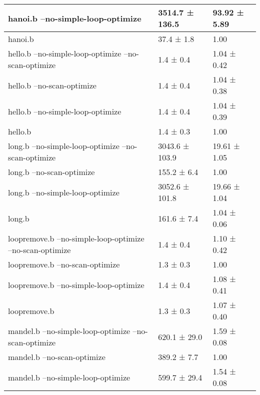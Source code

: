 \documentclass[11pt,answers]{exam}
\begin{document}
\begin{table}[H]
\begin{tabular}{|l|l|l|}
		hanoi.b --no-simple-loop-optimize                           & 3514.7 ± 136.5     & 93.92 ± 5.89      \\ \hline
		hanoi.b                                                     & 37.4 ± 1.8         & 1.00              \\ \hline
		\hline
		hello.b --no-simple-loop-optimize --no-scan-optimize        & 1.4 ± 0.4          & 1.04 ± 0.42       \\ \hline
		hello.b --no-scan-optimize                                  & 1.4 ± 0.4          & 1.04 ± 0.38       \\ \hline
		hello.b --no-simple-loop-optimize                           & 1.4 ± 0.4          & 1.04 ± 0.39       \\ \hline
		hello.b                                                     & 1.4 ± 0.3          & 1.00              \\ \hline
		\hline
		long.b --no-simple-loop-optimize --no-scan-optimize         & 3043.6 ± 103.9     & 19.61 ± 1.05      \\ \hline
		long.b --no-scan-optimize                                   & 155.2 ± 6.4        & 1.00              \\ \hline
		long.b --no-simple-loop-optimize                            & 3052.6 ± 101.8     & 19.66 ± 1.04      \\ \hline
		long.b                                                      & 161.6 ± 7.4        & 1.04 ± 0.06       \\ \hline
		\hline
		loopremove.b --no-simple-loop-optimize --no-scan-optimize   & 1.4 ± 0.4          & 1.10 ± 0.42       \\ \hline
		loopremove.b --no-scan-optimize                             & 1.3 ± 0.3          & 1.00              \\ \hline
		loopremove.b --no-simple-loop-optimize                      & 1.4 ± 0.4          & 1.08 ± 0.41       \\ \hline
		loopremove.b                                                & 1.3 ± 0.3          & 1.07 ± 0.40       \\ \hline
		\hline
		mandel.b --no-simple-loop-optimize --no-scan-optimize       & 620.1 ± 29.0       & 1.59 ± 0.08       \\ \hline
		mandel.b --no-scan-optimize                                 & 389.2 ± 7.7        & 1.00              \\ \hline
		mandel.b --no-simple-loop-optimize                          & 599.7 ± 29.4       & 1.54 ± 0.08       \\ \hline

\end{tabular}
\end{table}
\end{document}
